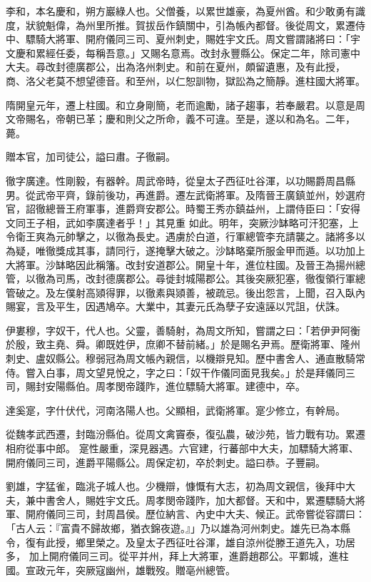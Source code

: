 \begin{pinyinscope}
 李和，本名慶和，朔方巖綠人也。父僧養，以累世雄豪，為夏州酋。和少敢勇有識度，狀貌魁偉，為州里所推。賀拔岳作鎮關中，引為帳內都督。後從周文，累遷侍中、驃騎大將軍、開府儀同三司、夏州刺史，賜姓宇文氏。周文嘗謂諸將曰：「宇文慶和累經任委，每稱吾意。」又賜名意焉。改封永豐縣公。保定二年，除司憲中大夫。尋改封德廣郡公，出為洛州刺史。和前在夏州，頗留遺惠，及有此授，
 商、洛父老莫不想望德音。和至州，以仁恕訓物，獄訟為之簡靜。進柱國大將軍。



 隋開皇元年，遷上柱國。和立身剛簡，老而逾勵，諸子趨事，若奉嚴君。以意是周文帝賜名，帝朝已革；慶和則父之所命，義不可違。至是，遂以和為名。二年，薨。



 贈本官，加司徒公，謚曰肅。子徹嗣。



 徹字廣達。性剛毅，有器幹。周武帝時，從皇太子西征吐谷渾，以功賜爵周昌縣男。從武帝平齊，錄前後功，再進爵。遷左武衛將軍。及隋晉王廣鎮並州，妙選府官，詔徹總晉王府軍事，進爵齊安郡公。時蜀王秀亦鎮益州，上謂侍臣曰：「安得文同王子相，武如李廣達者乎！」其見重
 如此。明年，突厥沙缽略可汗犯塞，上令衛王爽為元帥擊之，以徹為長史。遇虜於白道，行軍總管李充請襲之。諸將多以為疑，唯徹獎成其事，請同行，遂掩擊大破之。沙缽略棄所服金甲而遁。以功加上大將軍。沙缽略因此稱籓。改封安道郡公。開皇十年，進位柱國。及晉王為揚州總管，以徹為司馬，改封德廣郡公。尋徙封城陽郡公。其後突厥犯塞，徹復領行軍總管破之。及左僕射高熲得罪，以徹素與熲善，被疏忌。後出怨言，上聞，召入臥內賜宴，言及平生，因遇鳩卒。大業中，其妻元氏為孽子安遠誣以咒詛，伏誅。



 伊婁穆，字奴干，代人也。父靈，善騎射，為周文所知，嘗謂之曰：「若伊尹阿衡於殷，致主堯、舜。卿既姓伊，庶卿不替前緒。」於是賜名尹焉。歷衛將軍、隆州刺史、盧奴縣公。穆弱冠為周文帳內親信，以機辯見知。歷中書舍人、通直散騎常侍。嘗入白事，周文望見悅之，字之曰：「奴干作儀同面見我矣。」於是拜儀同三司，賜封安陽縣伯。周孝閔帝踐阼，進位驃騎大將軍。建德中，卒。



 達奚寔，字什伏代，河南洛陽人也。父顯相，武衛將軍。寔少修立，有幹局。



 從魏孝武西遷，封臨汾縣伯。從周文禽竇泰，復弘農，破沙苑，皆力戰有功。累遷相府從事中郎。
 寔性嚴重，深見器遇。六官建，行蕃部中大夫，加驃騎大將軍、開府儀同三司，進爵平陽縣公。周保定初，卒於刺史。謚曰恭。子豐嗣。



 劉雄，字猛雀，臨洮子城人也。少機辯，慷慨有大志，初為周文親信，後拜中大夫，兼中書舍人，賜姓宇文氏。周孝閔帝踐阼，加大都督。天和中，累遷驃騎大將軍、開府儀同三司，封周昌侯。歷位納言、內史中大夫、候正。武帝嘗從容謂曰：「古人云：『富貴不歸故鄉，猶衣錦夜遊。』」乃以雄為河州刺史。雄先已為本縣令，復有此授，鄉里榮之。及皇太子西征吐谷渾，雄自涼州從滕王道先入，功居多，
 加上開府儀同三司。從平并州，拜上大將軍，進爵趙郡公。平鄴城，進柱國。宣政元年，突厥寇幽州，雄戰歿。贈亳州總管。




\end{pinyinscope}
